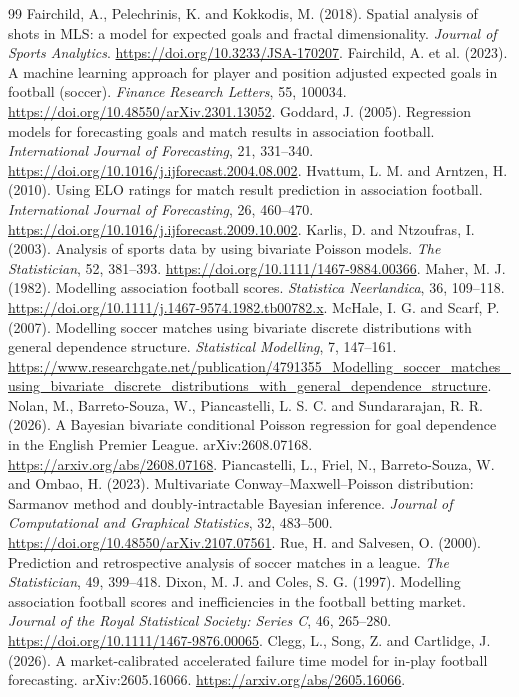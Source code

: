 \documentclass[11pt,a4paper]{amsart}
\numberwithin{equation}{section}
\begin{document}
\begin{thebibliography}{99}
 Fairchild, A., Pelechrinis, K. and Kokkodis, M. (2018). Spatial analysis of shots in MLS: a model for expected goals and fractal dimensionality. \emph{Journal of Sports Analytics}. \url{https://doi.org/10.3233/JSA-170207}.
 Fairchild, A. et al. (2023). A machine learning approach for player and position adjusted expected goals in football (soccer). \emph{Finance Research Letters}, 55, 100034. \url{https://doi.org/10.48550/arXiv.2301.13052}.
 Goddard, J. (2005). Regression models for forecasting goals and match results in association football. \emph{International Journal of Forecasting}, 21, 331--340. \url{https://doi.org/10.1016/j.ijforecast.2004.08.002}.
 Hvattum, L. M. and Arntzen, H. (2010). Using ELO ratings for match result prediction in association football. \emph{International Journal of Forecasting}, 26, 460--470. \url{https://doi.org/10.1016/j.ijforecast.2009.10.002}.
 Karlis, D. and Ntzoufras, I. (2003). Analysis of sports data by using bivariate Poisson models. \emph{The Statistician}, 52, 381--393. \url{https://doi.org/10.1111/1467-9884.00366}.
 Maher, M. J. (1982). Modelling association football scores. \emph{Statistica Neerlandica}, 36, 109--118. \url{https://doi.org/10.1111/j.1467-9574.1982.tb00782.x}.
 McHale, I. G. and Scarf, P. (2007). Modelling soccer matches using bivariate discrete distributions with general dependence structure. \emph{Statistical Modelling}, 7, 147--161. \url{https://www.researchgate.net/publication/4791355_Modelling_soccer_matches_using_bivariate_discrete_distributions_with_general_dependence_structure}.
 Nolan, M., Barreto-Souza, W., Piancastelli, L. S. C. and Sundararajan, R. R. (2026). A Bayesian bivariate conditional Poisson regression for goal dependence in the English Premier League. arXiv:2608.07168. \url{https://arxiv.org/abs/2608.07168}.
 Piancastelli, L., Friel, N., Barreto-Souza, W. and Ombao, H. (2023). Multivariate Conway--Maxwell--Poisson distribution: Sarmanov method and doubly-intractable Bayesian inference. \emph{Journal of Computational and Graphical Statistics}, 32, 483--500. \url{https://doi.org/10.48550/arXiv.2107.07561}.
 Rue, H. and Salvesen, O. (2000). Prediction and retrospective analysis of soccer matches in a league. \emph{The Statistician}, 49, 399--418.
 Dixon, M. J. and Coles, S. G. (1997). Modelling association football scores and inefficiencies in the football betting market. \emph{Journal of the Royal Statistical Society: Series C}, 46, 265--280. \url{https://doi.org/10.1111/1467-9876.00065}.
 Clegg, L., Song, Z. and Cartlidge, J. (2026). A market-calibrated accelerated failure time model for in-play football forecasting. arXiv:2605.16066. \url{https://arxiv.org/abs/2605.16066}.
\end{thebibliography}
\end{document}
